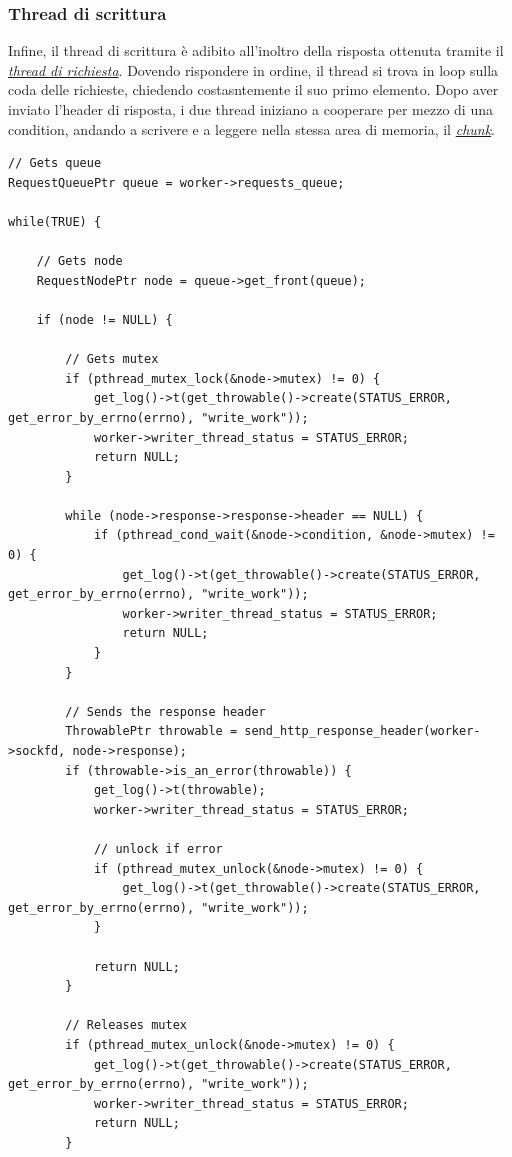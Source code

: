 \documentclass[italian]{tktltiki2}
\begin{document}
\subsubsection{Thread di scrittura}
\label{sec:writer}
Infine, il thread di scrittura è adibito all'inoltro della risposta ottenuta tramite il \hyperref[sec:request]{\emph{thread di richiesta}}. Dovendo rispondere in ordine, il thread si trova in loop sulla coda delle richieste, chiedendo costasntemente il suo primo elemento. Dopo aver inviato l'header di risposta, i due thread iniziano a cooperare per mezzo di una condition, andando a scrivere e a leggere nella stessa area di memoria, il \hyperref[sec:chunk]{\emph{chunk}}.
\begin{lstlisting}
// Gets queue
RequestQueuePtr queue = worker->requests_queue;

while(TRUE) {

    // Gets node
    RequestNodePtr node = queue->get_front(queue);

    if (node != NULL) {

        // Gets mutex
        if (pthread_mutex_lock(&node->mutex) != 0) {
            get_log()->t(get_throwable()->create(STATUS_ERROR, get_error_by_errno(errno), "write_work"));
            worker->writer_thread_status = STATUS_ERROR;
            return NULL;
        }

        while (node->response->response->header == NULL) {
            if (pthread_cond_wait(&node->condition, &node->mutex) != 0) {
                get_log()->t(get_throwable()->create(STATUS_ERROR, get_error_by_errno(errno), "write_work"));
                worker->writer_thread_status = STATUS_ERROR;
                return NULL;
            }
        }

        // Sends the response header
        ThrowablePtr throwable = send_http_response_header(worker->sockfd, node->response);
        if (throwable->is_an_error(throwable)) {
            get_log()->t(throwable);
            worker->writer_thread_status = STATUS_ERROR;

            // unlock if error
            if (pthread_mutex_unlock(&node->mutex) != 0) {
                get_log()->t(get_throwable()->create(STATUS_ERROR, get_error_by_errno(errno), "write_work"));
            }

            return NULL;
        }

        // Releases mutex
        if (pthread_mutex_unlock(&node->mutex) != 0) {
            get_log()->t(get_throwable()->create(STATUS_ERROR, get_error_by_errno(errno), "write_work"));
            worker->writer_thread_status = STATUS_ERROR;
            return NULL;
        }


\end{lstlisting}
\end{document}
